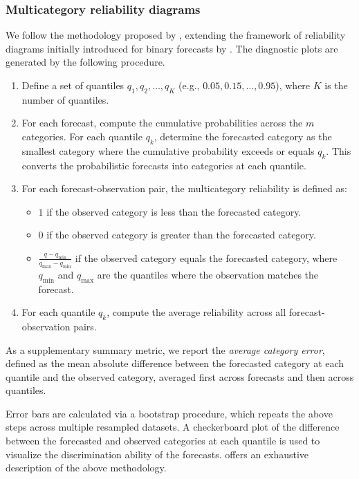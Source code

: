 \subsubsection{Multicategory reliability diagrams}
We follow the methodology proposed by \citet{hamill1997}, extending the framework of reliability diagrams initially introduced for binary forecasts by \citet{wilks1995a}.
The diagnostic plots are generated by the following procedure.
\begin{enumerate}    
    \item Define a set of quantiles $q_1, q_2, \dots, q_K$ (e.g., $0.05, 0.15, \dots, 0.95$), where $K$ is the number of quantiles.
    \item For each forecast, compute the cumulative probabilities across the $m$ categories. For each quantile $q_k$, determine the forecasted category as the smallest category where the cumulative probability exceeds or equals $q_k$. This converts the probabilistic forecasts into categories at each quantile.
    \item For each forecast-observation pair, the multicategory reliability is defined as:
    \begin{itemize}
        \item $1$ if the observed category is less than the forecasted category.
        \item $0$ if the observed category is greater than the forecasted category.
        \item $\frac{q - q_{\min}}{q_{\max} - q_{\min}}$ if the observed category equals the forecasted category, where $q_{\min}$ and $q_{\max}$ are the quantiles where the observation matches the forecast.
    \end{itemize}
    \item For each quantile $q_k$, compute the average reliability across all forecast-observation pairs.
\end{enumerate}
As a supplementary summary metric, we report the \textit{average category error}, defined as the mean absolute difference between the forecasted category at each quantile and the observed category, averaged first across forecasts and then across quantiles.

Error bars are calculated via a bootstrap procedure, which repeats the above steps across multiple resampled datasets. A checkerboard plot of the difference between the forecasted and observed categories at each quantile is used to visualize the discrimination ability of the forecasts. \citet{hamill1997} offers an exhaustive description of the above methodology.

